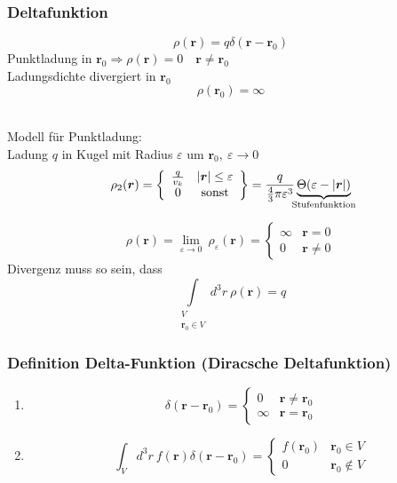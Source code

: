 \documentclass[titlepage,11pt,a4paper,ngerman]{report}
\newcommand{\delfkt}{\delta(\vec{r} - \vec{r}_0)}
\renewcommand{\vec}[1]{\boldsymbol{#1}}
\renewcommand{\epsilon}{\varepsilon}
\renewcommand{\paragraph}[1]{\subsubsection{#1}}
\begin{document}
\begin{minipage}{.6\linewidth}
	\paragraph{Deltafunktion}
	
	$$\rho (\vec{r}) = q \delta(\vec{r}-\vec{r}_0)$$
	Punktladung in $\vec{r}_0 \Rightarrow \rho(\vec{r}) = 0 \quad \vec{r} \neq \vec{r}_0$\\
	Ladungsdichte divergiert in $\vec{r}_0$
	$$\rho(\vec{r}_0) = \infty$$
\end{minipage}%
\begin{minipage}{.4\linewidth}
	\centering
\end{minipage}%
\\
Modell für Punktladung:\\
Ladung $q$ in Kugel mit Radius $\epsilon$  um $\vec{r}_0,\ \epsilon \rightarrow 0$
$$\rho_2 (\vec{r}) = \left\{ \begin{array}{cc}
\frac{q}{v_k} & |\vec{r}| \leq \epsilon\\
0 & \textrm{sonst}	
\end{array} \right\} = \frac{q}{\frac{4}{3}\pi \epsilon^3}\underbrace{\Theta (\epsilon - |\vec{r}|)}_{\mathclap{\textrm{Stufenfunktion}}}$$




$$\rho(\vec{r}) = \lim_{\epsilon \rightarrow 0}\ \rho_\epsilon (\vec{r}) = \left\{ \begin{array}{cc}
\infty & \vec{r} = 0\\
0 & \vec{r} \neq 0
\end{array}\right.$$
Divergenz muss so sein, dass $$ \int\limits_{\substack{V \\ \vec{r}_0 \in V}} d^3r\ \rho(\vec{r}) = q$$

\paragraph{Definition Delta-Funktion (Diracsche Deltafunktion)}

\begin{enumerate}
	\item 
	$$\delta (\vec{r} - \vec{r}_0) = \left\{ \begin{array}{cc}
		0 & \vec{r} \neq \vec{r}_0 \\
		\infty & \vec{r} = \vec{r}_0
	\end{array}\right.$$
	\item 
	$$\int_V d^3 r\ f(\vec{r}) \delfkt = \left\{ \begin{array}{cc}
		f(\vec{r}_0) & \vec{r}_0 \in V\\
		0 & \vec{r}_0 \notin V
	\end{array}\right.$$ 
\end{enumerate}
\end{document}

